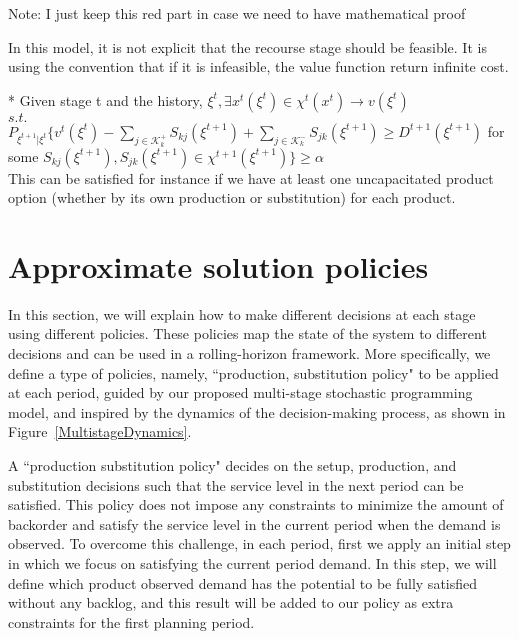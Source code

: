 \documentclass[10pt]{article}
\newcommand{\jey}{j} %
\newcommand{\Es}{S} %
\newcommand{\Csub}{\mathcal{K}^+_k}
\newcommand{\Psub}{\mathcal{K}^-_k}
\newcommand{\cred}{\color{red!65!black}}
\begin{document}
{\cred Note: I just keep this red part in case we need to have mathematical proof

In this model, it is not explicit that the recourse stage should be feasible. It is using the convention that if it is infeasible, the value function return infinite cost.}


{\cred * Given stage t and the history, $\xi^t, \exists x^t(\xi^t) \in \chi^t(x^t) \rightarrow v(\xi^t)$\\
$s.t.$ \\
$P_{\xi^{t+1}|\xi^t}\{v^{t}(\xi^t)-\sum_{\jey \in  \Csub}\Es_{kj}(\xi^{t+1})+\sum_{\jey \in  \Psub}\Es_{jk}(\xi^{t+1}) \geq D^{t+1}(\xi^{t+1}) $ for some $\Es_{kj}(\xi^{t+1}) , \Es_{jk}(\xi^{t+1}) \in  \chi ^{t+1}(\xi^{t+1}) \} \geq \alpha$ \\
This can be satisfied for instance if we have at least one uncapacitated product option (whether by its own production or substitution) for each product.

}


\section{Approximate solution policies}
\label{sec:approx}

In this section, we will explain how to make different decisions at each stage using different policies. These policies map the state of the system to different decisions and can be used in a rolling-horizon framework. 
More specifically, we define a type of policies, namely, ``production, substitution policy"  to be applied at each period, guided by our proposed multi-stage stochastic programming model, and inspired by the dynamics of the decision-making process, as shown in Figure~\ref{MultistageDynamics}. 

A ``production substitution policy" decides on the setup, production, and substitution decisions such that the service level in the next period can be satisfied. This policy does not impose any constraints to minimize the amount of backorder and satisfy the service level in the current period when the demand is observed. 
To overcome this challenge, in each period, first we apply an initial step in which we focus on satisfying the current period demand. 
In this step, we will define which product observed demand has the potential to be fully satisfied without any backlog, and this result will be added to our policy as extra constraints for the first planning period. 
\end{document}
